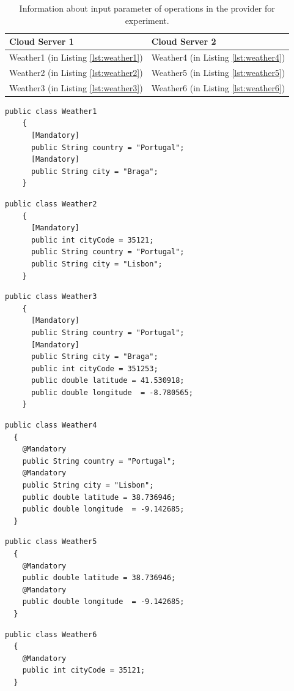 \begin{table}
\centering
\begin{tabular}{ p{5.50cm} p{5.50cm}}
\toprule
\multicolumn{1}{l}{\textbf{Cloud Server 1}} & \textbf{Cloud Server 2} \\
\midrule
Weather1 (in Listing \ref{lst:weather1}) & Weather4 (in Listing \ref{lst:weather4}) \\
\rowcolor{Gray}
Weather2 (in Listing \ref{lst:weather2}) & Weather5 (in Listing \ref{lst:weather5}) \\
Weather3 (in Listing \ref{lst:weather3}) & Weather6 (in Listing \ref{lst:weather6}) \\
\bottomrule
\end{tabular}
\caption[Information about input parameter of operations in the provider for experiment.]{Information about input parameter of operations in the provider for experiment.}
\label{tab:providerinput}
\end{table}

\begin{lstlisting}[caption=Details of Weather Object, label=lst:weather1]
  public class Weather1
    {
      [Mandatory]
      public String country = "Portugal";
      [Mandatory]
      public String city = "Braga";
    }
\end{lstlisting}
\begin{lstlisting}[caption=Details of Weather2 Object, label=lst:weather2]
  public class Weather2
    {
      [Mandatory]
      public int cityCode = 35121;
      public String country = "Portugal";
      public String city = "Lisbon";
    }
\end{lstlisting}
\begin{lstlisting}[caption=Details of Weather3 Object, label=lst:weather3]
  public class Weather3
    {
      [Mandatory]
      public String country = "Portugal";
      [Mandatory]
      public String city = "Braga";
      public int cityCode = 351253;
      public double latitude = 41.530918;
      public double longitude  = -8.780565;
    }
\end{lstlisting}
\begin{lstlisting}[caption=Details of Weather4 Object, label=lst:weather4]
  public class Weather4
  {
    @Mandatory
    public String country = "Portugal";
    @Mandatory
    public String city = "Lisbon";
    public double latitude = 38.736946;
    public double longitude  = -9.142685;
  }
\end{lstlisting}
\begin{lstlisting}[caption=Details of Weather5 Object, label=lst:weather5]
  public class Weather5
  {
    @Mandatory
    public double latitude = 38.736946;
    @Mandatory
    public double longitude  = -9.142685;
  }
\end{lstlisting}
\begin{lstlisting}[caption=Details of Weather6 Object, label=lst:weather6]
  public class Weather6
  {
    @Mandatory
    public int cityCode = 35121;
  }
\end{lstlisting}

